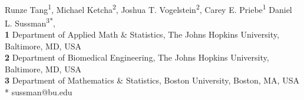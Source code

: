\documentclass[10pt,letterpaper]{article}
\date{}
\begin{document}
\vspace*{0.2in}

\begin{flushleft}
{\Large
\textbf{} %
}
\newline
\\
Runze Tang\textsuperscript{1},
Michael Ketcha\textsuperscript{2},
Joshua T. Vogelstein\textsuperscript{2},
Carey E. Priebe\textsuperscript{1}
Daniel L. Sussman\textsuperscript{3*},
\\
\bigskip
\textbf{1} Department of Applied Math \& Statistics, The Johns Hopkins University, Baltimore, MD, USA
\\
\textbf{2} Department of Biomedical Engineering,  The Johns Hopkins University, Baltimore, MD, USA
\\
\textbf{3} Department of Mathematics \& Statistics, Boston University, Boston, MA, USA
\\
* sussman@bu.edu
 \bigskip








\end{flushleft}
\end{document}
